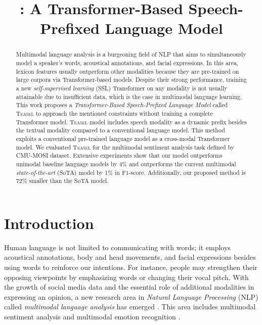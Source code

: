 \documentclass[letterpaper]{article} \usepackage{spconf,amsmath,graphicx}
\title{\teaselns: A Transformer-Based Speech-Prefixed Language Model}
\newcommand{\teasel}{\textsc{Teasel }}
\begin{document}
\maketitle

\begin{abstract}
Multimodal language analysis is a burgeoning field of NLP that aims to simultaneously model a speaker's words, acoustical annotations, and facial expressions. In this area, lexicon features usually outperform other modalities because they are pre-trained on large corpora via Transformer-based models. Despite their strong performance, training a new \textit{self-supervised learning} (SSL) Transformer on any modality is not usually attainable due to insufficient data, which is the case in multimodal language learning. This work proposes a \textit{Transformer-Based Speech-Prefixed Language Model} called \teasel to approach the mentioned constraints without training a complete Transformer model. \teasel model includes speech modality as a dynamic prefix besides the textual modality compared to a conventional language model. This method exploits a conventional pre-trained language model as a cross-modal Transformer model. We evaluated \teasel for the multimodal sentiment analysis task defined by CMU-MOSI dataset. Extensive experiments show that our model outperforms unimodal baseline language models by 4\% and outperforms the current multimodal \textit{state-of-the-art} (SoTA) model by 1\% in F$1$-score. Additionally, our proposed method is 72\% smaller than the SoTA model.

\end{abstract}

\section{Introduction}

Human language is not limited to communicating with words; it employs acoustical annotations, body and head movements, and facial expressions besides using words to reinforce our intentions. For instance, people may strengthen their opposing viewpoints by emphasizing words or changing their vocal pitch. With the growth of social media data and the essential role of additional modalities in expressing an opinion, a new research area in \textit{Natural Language Processing} (NLP) called \textit{multimodal language analysis} has emerged \cite{challenge-hml-2020-grand}. This area includes multimodal sentiment analysis \cite{morency_towards_2011, soleymani2017survey} and multimodal emotion recognition \cite{bagher-zadeh-etal-2018-multimodal, busso2008iemocap}. 
\end{document}
